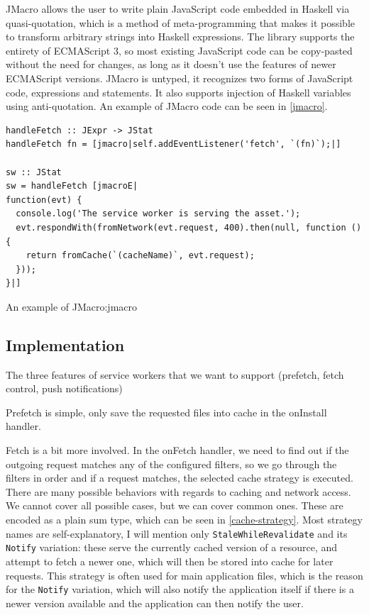 \documentclass[english,odsaz]{fitthesis}
\begin{document}
JMacro allows the user to write plain JavaScript code embedded in Haskell via
quasi-quotation, which is a method of meta-programming that makes it possible to
transform arbitrary strings into Haskell expressions. The library supports the
entirety of ECMAScript 3, so most existing JavaScript code can be copy-pasted
without the need for changes, as long as it doesn't use the features of newer
ECMAScript versions. JMacro is untyped, it recognizes two forms of JavaScript
code, expressions and statements. It also supports injection of Haskell
variables using anti-quotation. An example of JMacro code can be seen in \ref{jmacro}.

\begin{listing}[htbp]
\begin{verbatim}
handleFetch :: JExpr -> JStat
handleFetch fn = [jmacro|self.addEventListener('fetch', `(fn)`);|]

sw :: JStat
sw = handleFetch [jmacroE|
function(evt) {
  console.log('The service worker is serving the asset.');
  evt.respondWith(fromNetwork(evt.request, 400).then(null, function () {
    return fromCache(`(cacheName)`, evt.request);
  }));
}|]
\end{verbatim}
\caption{An example of JMacro:jmacro}
\end{listing}

\subsection{Implementation}
\label{sec:org83f89fe}
The three features of service workers that we want to support (prefetch, fetch
control, push notifications)

Prefetch is simple, only save the requested files into cache in the onInstall
handler.

Fetch is a bit more involved. In the onFetch handler, we need to find out if the
outgoing request matches any of the configured filters, so we go through the
filters in order and if a request matches, the selected cache strategy is
executed. There are many possible behaviors with regards to caching and network
access. We cannot cover all possible cases, but we can cover common ones. These
are encoded as a plain sum type, which can be seen in \ref{cache-strategy}. Most
strategy names are self-explanatory, I will mention only \texttt{StaleWhileRevalidate}
and its \texttt{Notify} variation: these serve the currently cached version of a
resource, and attempt to fetch a newer one, which will then be stored into cache
for later requests. This strategy is often used for main application files,
which is the reason for the \texttt{Notify} variation, which will also notify the
application itself if there is a newer version available and the application can
then notify the user.
\end{document}
